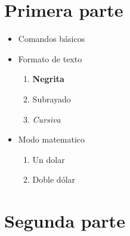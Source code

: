 \documentclass[10pt,a4paper]{article}
\begin{document}
\chapter{Primera parte}
	\begin{itemize}
		\item Comandos básicos
		\item Formato de texto 
			\begin{enumerate}
				\item {\bf Negrita}
				\item Subrayado
				\item {\em Cursiva}
		\end{enumerate}
	\end{itemize}
		
	\begin{itemize}
		\item Modo matematico
			\begin{enumerate}
			\item Un dolar
			\item Doble dólar
		\end{enumerate}
	\end{itemize}
		
		
\chapter{Segunda parte}
	
\end{document}
